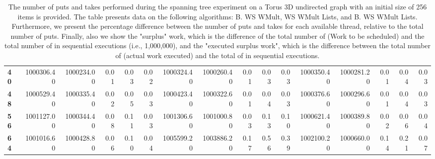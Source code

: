 \begin{table}[!ht]
{\begin{tabular}{lrrrrrrrrrrrrrrr}
\textbf{40} &  1000306.40 & 1000234.00 &           0.01 &        0.03 &                 0.02 &     1000324.40 & 1000260.40 &           0.01 &        0.03 &                 0.03 &        1000350.40 & 1000281.20 &           0.01 &        0.04 &                 0.03 \\
\textbf{48} &  1000529.40 & 1000335.40 &           0.02 &        0.05 &                 0.03 &     1000423.40 & 1000322.60 &           0.01 &        0.04 &                 0.03 &        1000376.60 & 1000296.60 &           0.01 &        0.04 &                 0.03 \\
\textbf{56} &  1001127.00 & 1000344.40 &           0.08 &        0.11 &                 0.03 &     1001306.60 & 1001000.80 &           0.03 &        0.13 &                 0.10 &        1000621.40 & 1000389.80 &           0.02 &        0.06 &                 0.04 \\
\textbf{64} &  1001016.60 & 1000428.80 &           0.06 &        0.10 &                 0.04 &     1005599.20 & 1003886.20 &           0.17 &        0.56 &                 0.39 &        1002100.20 & 1000660.00 &           0.14 &        0.21 &                 0.07 \\
\bottomrule
\end{tabular}}
\label{difference-Torus_3D_undirected-256-B_WS_NC_MULT_OPT-WS_NC_MULT_LA_OPT-B_WS_NC_MULT_LA_OPT}
\caption{The number of puts and takes performed during the
    spanning tree experiment on a Torus 3D undirected graph with an initial size
    of 256 items is provided. The table presents data on the
    following algorithms: B. WS WMult, WS WMult Lists, and
    B. WS WMult Lists. Furthermore, we present the percentage difference
    between the number of puts and takes for each available thread,
    relative to the total number of puts. Finally, also we show the
    "surplus" work, which is the difference of the total number of
    \Puts (Work to be scheduled) and the total number of \Puts in
    sequential executions (i.e., 1,000,000), and the "executed surplus
    work", which is the difference between the total number of \Takes
    (actual work executed) and the total of \Takes in sequential
    executions.}
\end{table}
